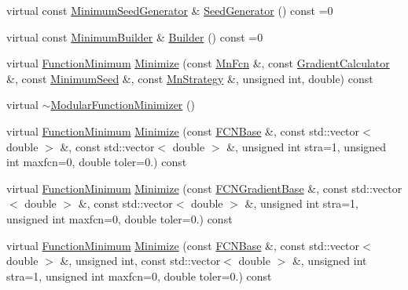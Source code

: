 \begin{DoxyCompactItemize}
\item 
virtual const \mbox{\hyperlink{classROOT_1_1Minuit2_1_1MinimumSeedGenerator}{Minimum\+Seed\+Generator}} \& \mbox{\hyperlink{classROOT_1_1Minuit2_1_1ModularFunctionMinimizer_a742930de97b0ce9ba23773874ae0894b}{Seed\+Generator}} () const =0
\item 
virtual const \mbox{\hyperlink{classROOT_1_1Minuit2_1_1MinimumBuilder}{Minimum\+Builder}} \& \mbox{\hyperlink{classROOT_1_1Minuit2_1_1ModularFunctionMinimizer_a13e98551cf14e927c61e1e34ecf8ba8b}{Builder}} () const =0
\item 
virtual \mbox{\hyperlink{classROOT_1_1Minuit2_1_1FunctionMinimum}{Function\+Minimum}} \mbox{\hyperlink{classROOT_1_1Minuit2_1_1ModularFunctionMinimizer_ac2b4ce9fa735f5014f610fd0374c58e4}{Minimize}} (const \mbox{\hyperlink{classROOT_1_1Minuit2_1_1MnFcn}{Mn\+Fcn}} \&, const \mbox{\hyperlink{classROOT_1_1Minuit2_1_1GradientCalculator}{Gradient\+Calculator}} \&, const \mbox{\hyperlink{classROOT_1_1Minuit2_1_1MinimumSeed}{Minimum\+Seed}} \&, const \mbox{\hyperlink{classROOT_1_1Minuit2_1_1MnStrategy}{Mn\+Strategy}} \&, unsigned int, double) const
\item 
virtual \mbox{\hyperlink{classROOT_1_1Minuit2_1_1ModularFunctionMinimizer_ae8442b0de1a033c86c7b5167f66e0eed}{$\sim$\+Modular\+Function\+Minimizer}} ()
\item 
virtual \mbox{\hyperlink{classROOT_1_1Minuit2_1_1FunctionMinimum}{Function\+Minimum}} \mbox{\hyperlink{classROOT_1_1Minuit2_1_1ModularFunctionMinimizer_a0a881c0e1c53c2144c437cfb18f1971e}{Minimize}} (const \mbox{\hyperlink{classROOT_1_1Minuit2_1_1FCNBase}{F\+C\+N\+Base}} \&, const std\+::vector$<$ double $>$ \&, const std\+::vector$<$ double $>$ \&, unsigned int stra=1, unsigned int maxfcn=0, double toler=0.) const
\item 
virtual \mbox{\hyperlink{classROOT_1_1Minuit2_1_1FunctionMinimum}{Function\+Minimum}} \mbox{\hyperlink{classROOT_1_1Minuit2_1_1ModularFunctionMinimizer_a8354ed4403dda68040ea4d1b174835c1}{Minimize}} (const \mbox{\hyperlink{classROOT_1_1Minuit2_1_1FCNGradientBase}{F\+C\+N\+Gradient\+Base}} \&, const std\+::vector$<$ double $>$ \&, const std\+::vector$<$ double $>$ \&, unsigned int stra=1, unsigned int maxfcn=0, double toler=0.) const
\item 
virtual \mbox{\hyperlink{classROOT_1_1Minuit2_1_1FunctionMinimum}{Function\+Minimum}} \mbox{\hyperlink{classROOT_1_1Minuit2_1_1ModularFunctionMinimizer_ab9a4f3d9f93071d0363ad838c103690d}{Minimize}} (const \mbox{\hyperlink{classROOT_1_1Minuit2_1_1FCNBase}{F\+C\+N\+Base}} \&, const std\+::vector$<$ double $>$ \&, unsigned int, const std\+::vector$<$ double $>$ \&, unsigned int stra=1, unsigned int maxfcn=0, double toler=0.) const

\end{DoxyCompactItemize}
